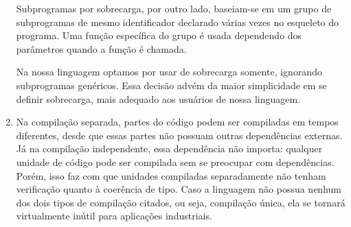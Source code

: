 \documentclass[12pt, a4paper]{article}
\begin{document}
\begin{enumerate}
\begin{comment}
            float soma(float a, float b) {
                return a+b;
            }

            int soma(String a, String b) {
                return a^b;
            }
        \end{comment}

        Subprogramas por sobrecarga, por outro lado, baseiam-se em um grupo de
        subprogramas de mesmo identificador declarado várias vezes no esqueleto
        do programa. Uma função específica do grupo é usada dependendo dos
        parâmetros quando a função é chamada.

        Na nossa linguagem optamos por usar de sobrecarga somente, ignorando
        subprogramas genéricos. Essa decisão advém da maior simplicidade em se
        definir sobrecarga, mais adequado aos usuários de nossa linguagem.

        \item
        \begin{comment}
            (Compilação separada: as unidades de compilação podem ser
            compiladas em tempos diferentes, mas elas não são independentes uma
            da outra se qualquer uma delas acessar ou usar quaisquer entidades
            da outra. Tal interdependência é necessária se precisar ser feita
            verificação de interface.) (Compilação independente: unidades de
            programa podem ser compiladas sem informações sobre quaisquer
            outras unidades de programa.  Unidades compiladas separadamente não
            são verificadas quanto à coerência de tipos) (Algumas linguagens
            não oferecem nem compilação separada, nem compilação independente,
            significando que somente a unidade de compilação é um programa
            completo. Isso a torna virtualmente inútil para aplicações
            industriais)
        \end{comment}

        Na compilação separada, partes do código podem ser compiladas em tempos
        diferentes, desde que essas partes não possuam outras dependências
        externas. Já na compilação independente, essa dependência não importa:
        qualquer unidade de código pode ser compilada sem se preocupar com
        dependências. Porém, isso faz com que unidades compiladas separadamente
        não tenham verificação quanto à coerência de tipo. Caso a linguagem não
        possua nenhum dos dois tipos de compilação citados, ou seja, compilação
        única, ela se tornará virtualmente inútil para aplicações industriais.


\end{enumerate}
\end{document}
